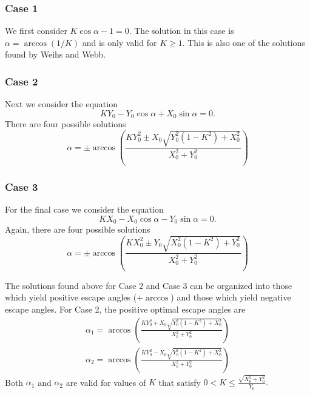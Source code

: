 \documentclass[12pt]{article}
\def\ds{\displaystyle}
\begin{document}
\subsubsection{Case 1}
We first consider $K \cos \alpha - 1=0$. The solution in this case is $\alpha = \arccos(1/K)$ and is only valid for $K\geq 1$. This is also one of the solutions found by Weihs and Webb.
%
\subsubsection{Case 2}
Next we consider the equation 
%
\begin{equation}
K Y_0 - Y_0 \cos \alpha + X_0 \sin\alpha = 0.
\end{equation}
%
There are four possible solutions 
%
\begin{equation}
\alpha = \pm \arccos \left( \frac{K Y_0^2 \pm X_0 
\ds\sqrt{Y_0^2(1- K^2) + X_0^2 }}{X_0^2+Y_0^2} \right )
\end{equation}
%	
\subsubsection{Case 3}
For the final case we consider the equation 
%
\begin{equation}
K X_0 - X_0 \cos \alpha - Y_0 \sin\alpha = 0.
\end{equation}
%
Again, there are four possible solutions
%
\begin{equation}
\alpha = \pm \arccos \left( \frac{K X_0^2 \pm Y_0 
\ds \sqrt{X_0^2(1-K^2) +Y_0^2}}{X_0^2+Y_0^2} \right )
\end{equation}
%

The solutions found above for Case 2 and Case 3 can be organized into those which yield positive escape angles ($+ \arccos$) and those which yield negative escape angles. For Case 2, the positive optimal escape angles are 
%
\begin{align}
\alpha_{1} =  \arccos \left( \frac{K Y_0^2 +X_0 
\ds\sqrt{Y_0^2(1- K^2) + X_0^2 }}{X_0^2+Y_0^2} \right )
\tag{15a} \label{root_a} \\
\alpha_{2} = \arccos \left(\frac{K Y_0^2 - X_0 
\ds\sqrt{Y_0^2(1- K^2) + X_0^2 }}{X_0^2+Y_0^2} \right )
\tag{15b} \label{root_b}
\end{align}
%
Both $\alpha_1$ and $\alpha_2$ are valid for values of $K$ that satisfy 
$0< K \leq \ds \frac{\sqrt{X_0^2 + Y_0^2}}{Y_0}.$





\end{document}
